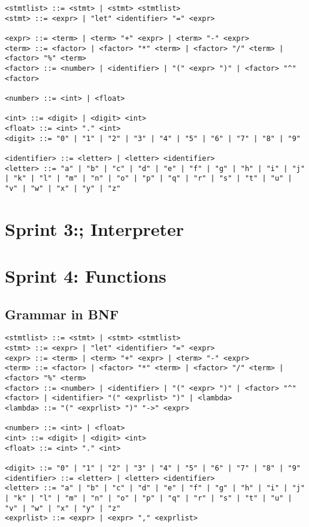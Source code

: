 \documentclass[a4paper, oneside, 11pt]{report}
\begin{document}
\begin{verbatim}
<stmtlist> ::= <stmt> | <stmt> <stmtlist>
<stmt> ::= <expr> | "let" <identifier> "=" <expr>

<expr> ::= <term> | <term> "+" <expr> | <term> "-" <expr>
<term> ::= <factor> | <factor> "*" <term> | <factor> "/" <term> | <factor> "%" <term>
<factor> ::= <number> | <identifier> | "(" <expr> ")" | <factor> "^" <factor>

<number> ::= <int> | <float>

<int> ::= <digit> | <digit> <int>
<float> ::= <int> "." <int>
<digit> ::= "0" | "1" | "2" | "3" | "4" | "5" | "6" | "7" | "8" | "9"

<identifier> ::= <letter> | <letter> <identifier>
<letter> ::= "a" | "b" | "c" | "d" | "e" | "f" | "g" | "h" | "i" | "j" | "k" | "l" | "m" | "n" | "o" | "p" | "q" | "r" | "s" | "t" | "u" | "v" | "w" | "x" | "y" | "z"
\end{verbatim}

\section{Sprint 3:; Interpreter}\label{sec:interpreter}

\section{Sprint 4: Functions}\label{sec:functions}

\subsection{Grammar in BNF}\label{subsec:grammar-in-bnf3}

\begin{verbatim}
<stmtlist> ::= <stmt> | <stmt> <stmtlist>
<stmt> ::= <expr> | "let" <identifier> "=" <expr>
<expr> ::= <term> | <term> "+" <expr> | <term> "-" <expr>
<term> ::= <factor> | <factor> "*" <term> | <factor> "/" <term> | <factor> "%" <term>
<factor> ::= <number> | <identifier> | "(" <expr> ")" | <factor> "^" <factor> | <identifier> "(" <exprlist> ")" | <lambda>
<lambda> ::= "(" <exprlist> ")" "->" <expr>

<number> ::= <int> | <float>
<int> ::= <digit> | <digit> <int>
<float> ::= <int> "." <int>

<digit> ::= "0" | "1" | "2" | "3" | "4" | "5" | "6" | "7" | "8" | "9"
<identifier> ::= <letter> | <letter> <identifier>
<letter> ::= "a" | "b" | "c" | "d" | "e" | "f" | "g" | "h" | "i" | "j" | "k" | "l" | "m" | "n" | "o" | "p" | "q" | "r" | "s" | "t" | "u" | "v" | "w" | "x" | "y" | "z"
<exprlist> ::= <expr> | <expr> "," <exprlist>
	
\end{verbatim}
\end{document}
